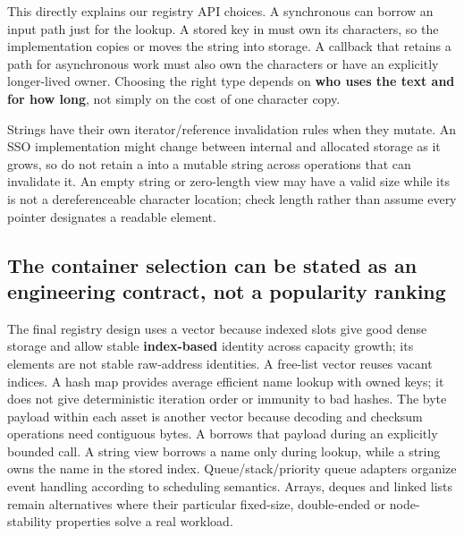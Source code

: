 This directly explains our registry API choices. A synchronous  can borrow an input path just for the lookup. A stored key in  must own its characters, so the implementation copies or moves the string into  storage. A callback that retains a path for asynchronous work must also own the characters or have an explicitly longer-lived owner. Choosing the right type depends on \textbf{who uses the text and for how long}, not simply on the cost of one character copy.

Strings have their own iterator/reference invalidation rules when they mutate. An SSO implementation might change between internal and allocated storage as it grows, so do not retain a  into a mutable string across operations that can invalidate it. An empty string or zero-length view may have a valid size while its  is not a dereferenceable character location; check length rather than assume every pointer designates a readable element.

\subsection{The container selection can be stated as an engineering contract, not a popularity ranking}\label{05-engine-i-ch005-the-container-selection-can-be-stated-as-an-engineering-contract-not-a-popularity-ranking}

\hypertarget{05-engine-i-ch005-the-container-selection-can-be-stated-as-an-engineering-contract-not-a-popularity-ranking}{}

The final registry design uses a vector because indexed slots give good dense storage and allow stable \textbf{index-based} identity across capacity growth; its elements are not stable raw-address identities. A free-list vector reuses vacant indices. A hash map provides average efficient name lookup with owned keys; it does not give deterministic iteration order or immunity to bad hashes. The byte payload within each asset is another vector because decoding and checksum operations need contiguous bytes. A  borrows that payload during an explicitly bounded call. A string view borrows a name only during lookup, while a string owns the name in the stored index. Queue/stack/priority queue adapters organize event handling according to scheduling semantics. Arrays, deques and linked lists remain alternatives where their particular fixed-size, double-ended or node-stability properties solve a real workload.

